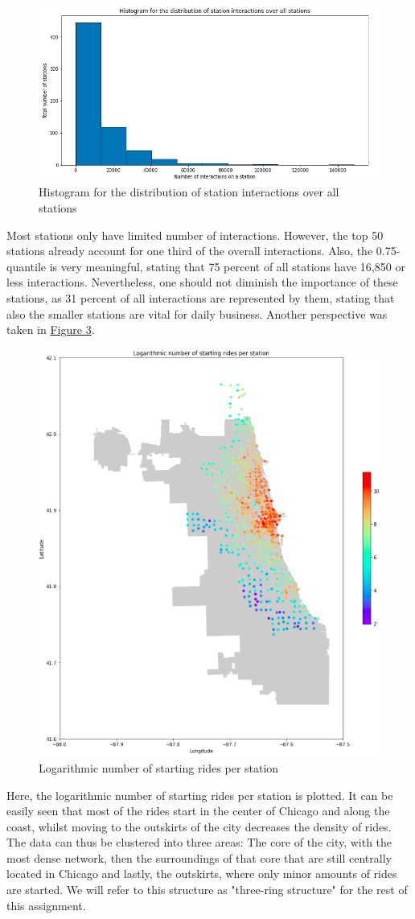 \begin{figure}[H]
    \centering
    \includegraphics[width=0.7\linewidth]{./Figures/GeoAbb4.png}
    \caption{Histogram for the distribution of station interactions over all stations}
    \label{fig4}
\end{figure}

Most stations only have limited number of interactions. However, the top 50 stations already account for one third of the overall interactions. Also, the 0.75-quantile is very meaningful, stating that 75 percent of all stations have 16,850 or less interactions. Nevertheless, one should not diminish the importance of these stations, as 31 percent of all interactions are represented by them, stating that also the smaller stations are vital for daily business.
Another perspective was taken in \hyperref[fig4]{Figure 3}.

\begin{figure}[H]
    \centering
    \includegraphics[width=0.6\linewidth]{./Figures/GeoAbb9.png}
    \caption{Logarithmic number of starting rides per station}
    \label{fig9}
\end{figure}


Here, the logarithmic number of starting rides per station is plotted. It can be easily seen that most of the rides start in the center of Chicago and along the coast, whilst moving to the outskirts of the city decreases the density of rides. The data can thus be clustered into three areas: The core of the city, with the most dense network, then the surroundings of that core that are still centrally located in Chicago and lastly, the outskirts, where only minor amounts of rides are started. We will refer to this structure as "three-ring structure" for the rest of this assignment.  


